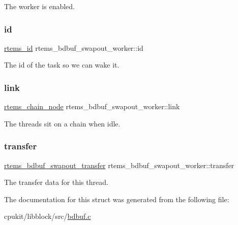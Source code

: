 The worker is enabled. \mbox{\label{structrtems__bdbuf__swapout__worker_a9cbb89036dbe3bf0cf894ee87cb0c75f}} 
\subsubsection{\texorpdfstring{id}{id}}
{\footnotesize\ttfamily \mbox{\hyperlink{group__ClassicTasks_gab20892b814dced7dd4e5b9bf42becd57}{rtems\+\_\+id}} rtems\+\_\+bdbuf\+\_\+swapout\+\_\+worker\+::id}

The id of the task so we can wake it. \mbox{\label{structrtems__bdbuf__swapout__worker_a0698e366425c95d0077f68fdf6cf3281}} 
\subsubsection{\texorpdfstring{link}{link}}
{\footnotesize\ttfamily \mbox{\hyperlink{structChain__Node__struct}{rtems\+\_\+chain\+\_\+node}} rtems\+\_\+bdbuf\+\_\+swapout\+\_\+worker\+::link}

The threads sit on a chain when idle. \mbox{\label{structrtems__bdbuf__swapout__worker_a2bb005ceaf36d6278bdab8f1b1182343}} 
\subsubsection{\texorpdfstring{transfer}{transfer}}
{\footnotesize\ttfamily \mbox{\hyperlink{structrtems__bdbuf__swapout__transfer}{rtems\+\_\+bdbuf\+\_\+swapout\+\_\+transfer}} rtems\+\_\+bdbuf\+\_\+swapout\+\_\+worker\+::transfer}

The transfer data for this thread. 

The documentation for this struct was generated from the following file\+:\begin{DoxyCompactItemize}
\item 
cpukit/libblock/src/\mbox{\hyperlink{bdbuf_8c}{bdbuf.\+c}}\end{DoxyCompactItemize}
